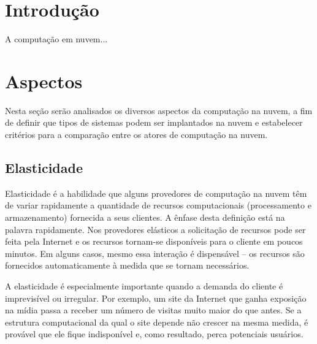 
\section{Introdução}
A computação em nuvem... \cite{acm:s3,wired:end,akita}

\section{Aspectos}

Nesta seção serão analisados os diversos aspectos da computação na nuvem, a fim de definir que tipos de sistemas podem ser implantados na nuvem e estabelecer critérios para a comparação entre os atores de computação na nuvem.

\subsection{Elasticidade}


Elasticidade é a habilidade que alguns provedores de computação na nuvem têm de variar rapidamente a quantidade de recursos computacionais (processamento e armazenamento) fornecida a seus clientes. A ênfase desta definição está na palavra rapidamente. Nos provedores elásticos a solicitação de recursos pode ser feita pela Internet e os recursos tornam-se disponíveis para o cliente em poucos minutos. Em alguns casos, mesmo essa interação é dispensável -- os recursos são fornecidos automaticamente à medida que se tornam necessários.


A elasticidade é especialmente importante quando a demanda do cliente é imprevisível ou irregular. Por exemplo, um site da Internet que ganha exposição na mídia passa a receber um número de visitas muito maior do que antes. Se a estrutura computacional da qual o site depende não crescer na mesma medida, é provável que ele fique indisponível e, como resultado, perca potenciais usuários.


